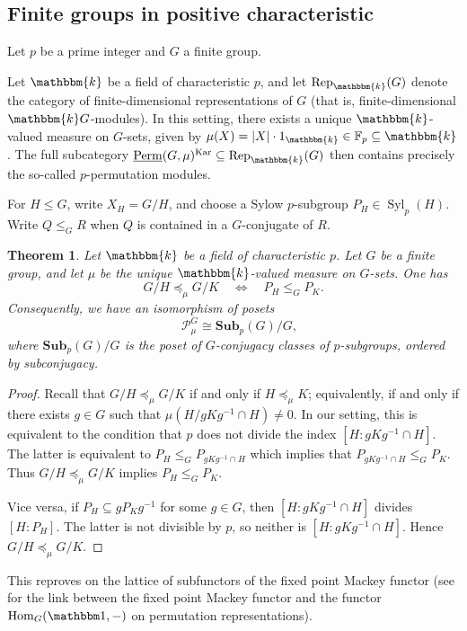 \documentclass[11pt,a4paper]{amsart}
\theoremstyle{plain}%
\newtheorem{theorem}[lemma]{Theorem}
\theoremstyle{definition}
\theoremstyle{remark}
\newcommand{\Hom}{\operatorname{Hom}}
\newcommand{\triv}{{\mathbbm 1}}
\newcommand{\Perm}{\underline{{\rm Perm}}}
\newcommand{\Rep}{\operatorname{Rep}}
\newcommand{\kk}{\mathbbm{k}}
\newcommand{\Kar}{\mathrm{Kar}}
\newcommand{\Syl}{\operatorname{Syl}}
\newcommand{\Sub}{\mathbf{Sub}}
\newcommand{\cP}{\mathcal{P}}
\begin{document}
\subsection{Finite groups in positive characteristic}\label{sec:finite-groups}
Let $p$ be a prime integer and $G$ a finite group.

Let $\kk$ be a field of characteristic $p$, and let $   \Rep_{\kk}(G)$ denote the category of finite-dimensional representations of $G$ (that is, finite-dimensional $\kk G$-modules). In this setting, there exists a unique $\kk$-valued measure on $G$-sets, given by $\mu(X) = |X|\cdot 1_{\kk}\in \mathbb{F}_p\subseteq \kk$. The full subcategory $\Perm(G, \mu)^{\Kar} \subseteq \Rep_{\kk}(G)$ then contains precisely the so-called $p$-permutation modules.



For $H\leq G$, write $X_H=G/H$, and choose a Sylow $p$-subgroup
$P_H\in\Syl_p(H)$. Write $Q\leq_G R$ when $Q$ is contained in a
$G$-conjugate of $R$.

\begin{theorem}\label{thm:E-p-subgroups}
Let $\kk$ be a field of characteristic $p$.
Let $G$ be a finite group, and let $\mu$ be the unique $\kk$-valued measure on $G$-sets. One has
\[
  G/H\preceq_\mu G/K
  \quad\Longleftrightarrow\quad
  P_H\leq_G P_K.
\]
Consequently, we have an isomorphism of posets
\[
\quad
  \cP_\mu^G\cong \Sub_p(G)/G,
\]
where $\Sub_p(G)/G$ is the poset of $G$-conjugacy classes of $p$-subgroups,
ordered by subconjugacy.
\end{theorem}

\begin{proof}
    Recall that $G/H\preceq_\mu G/K$ if and only if $H\preceq_\mu K$; equivalently, if and only if there exists $g\in G$ such that $\mu(H/gKg^{-1}\cap H)\neq 0$. In our setting, this is equivalent to the condition that $p$ does not divide the index $[H:gKg^{-1}\cap H]$. The latter is equivalent to $P_H \leq_G P_{gKg^{-1}\cap H}$ which implies that $ P_{gKg^{-1}\cap H} \leq_G P_K$. Thus $G/H\preceq_\mu G/K$ implies $P_H\leq_G P_K$.

    Vice versa, if $P_H\subseteq g P_Kg^{-1}$ for some $g\in G$, then $[H:gKg^{-1}\cap H]$ divides $[H:P_H]$. The latter is not divisible by $p$, so neither is $[H:gKg^{-1}\cap H]$. Hence $G/H\preceq_\mu G/K$. 
\end{proof}
This reproves \cite[Corollary 15.3(ii)]{TW} on the lattice of subfunctors of the fixed point Mackey functor (see \cite{Yo} for the link between the fixed point Mackey functor and the functor $\Hom_G(\triv, -)$ on permutation representations).
\end{document}
